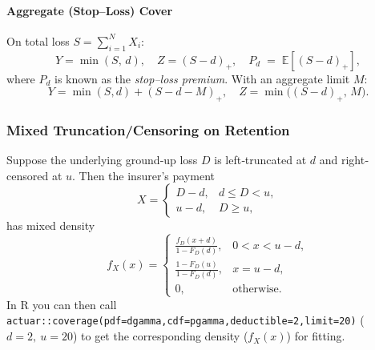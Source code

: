 \documentclass[11pt]{article}
\begin{document}
\paragraph{Aggregate (Stop–Loss) Cover}  
On total loss \(S=\sum_{i=1}^N X_i\):
\[
  Y = \min(S,\,d),
  \quad
  Z = (S - d)_{+},
  \quad
  P_d \;=\;\mathbb{E}[(S-d)_{+}],
\]
where \(P_d\) is known as the \emph{stop–loss premium}.  With an aggregate limit \(M\):
\[
  Y = \min(S,d) + (S - d - M)_{+},
  \quad
  Z = \min\bigl((S - d)_{+},\,M\bigr).
\]

\subsubsection{Mixed Truncation/Censoring on Retention}

Suppose the underlying ground‐up loss \(D\) is left‐truncated at \(d\) and right‐censored at \(u\).  Then the insurer’s payment
\[
  X = 
  \begin{cases}
    D - d, & d \le D < u,\\
    u - d, & D \ge u,
  \end{cases}
\]
has mixed density
\[
  f_X(x)
   =
  \begin{cases}
    \displaystyle
    \frac{f_D(x+d)}{1 - F_D(d)}, 
    & 0 < x < u - d,\\[6pt]
    \displaystyle
    \frac{1 - F_D(u)}{1 - F_D(d)},
    & x = u - d,\\
    0,&\text{otherwise.}
  \end{cases}
\]
In \textsf{R} you can then call  
\verb|actuar::coverage(pdf=dgamma,cdf=pgamma,deductible=2,limit=20)|  
 ($d=2, \ u=20$) to get the corresponding density ($f_{X}(x)$) for fitting.
\end{document}

